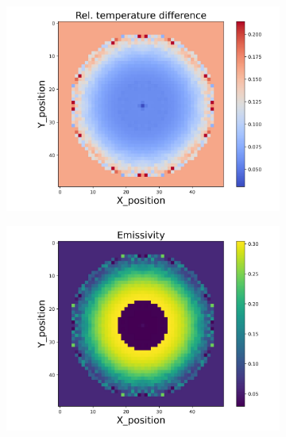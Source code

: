 \begin{figure}[htbp]
    \begin{minipage}{\textwidth}
        \centering
        \begin{subfigure}{0.49\textwidth}
            \centering
            \includegraphics[width=\textwidth]{figures/raw_data/21/mix/T_bias.jpg}
        \end{subfigure}
        \begin{subfigure}{0.49\textwidth}
            \centering
            \includegraphics[width=\textwidth]{figures/raw_data/21/mix/emi_cal.jpg}
        \end{subfigure}
    \end{minipage}\\

\end{figure}
